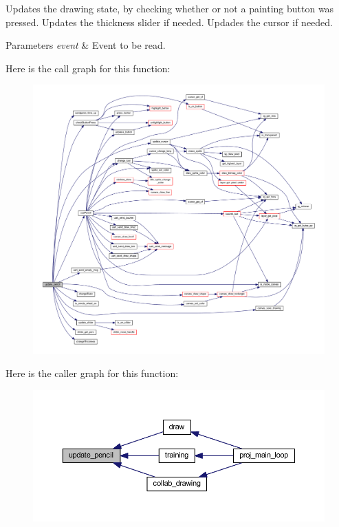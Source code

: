 Updates the drawing state, by checking whether or not a painting button was pressed. Updates the thickness slider if needed. Updades the cursor if needed. 


\begin{DoxyParams}{Parameters}
{\em event} & Event to be read. \\
\hline
\end{DoxyParams}
Here is the call graph for this function\+:\nopagebreak
\begin{figure}[H]
\begin{center}
\leavevmode
\includegraphics[width=350pt]{group__pengoo_ga3df244ae6ccf0baca3f8426c306d3802_cgraph}
\end{center}
\end{figure}
Here is the caller graph for this function\+:\nopagebreak
\begin{figure}[H]
\begin{center}
\leavevmode
\includegraphics[width=350pt]{group__pengoo_ga3df244ae6ccf0baca3f8426c306d3802_icgraph}
\end{center}
\end{figure}
\mbox{\label{group__pengoo_ga6ac5130bfa3fa90697b1368d605563c0}} 
